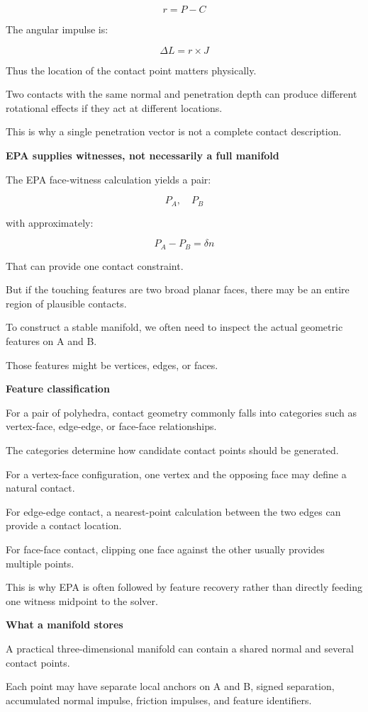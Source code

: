 \[
r=P-C
\]

The angular impulse is:

\[
\boxed{ \Delta L=r\times J }
\]

Thus the location of the contact point matters physically.

Two contacts with the same normal and penetration depth can produce different rotational effects if they act at different locations.

This is why a single penetration vector is not a complete contact description.

\textbf{EPA supplies witnesses, not necessarily a full manifold}

The EPA face-witness calculation yields a pair:

\[
P_A,\quad P_B
\]

with approximately:

\[
P_A-P_B=\delta n
\]

That can provide one contact constraint.

But if the touching features are two broad planar faces, there may be an entire region of plausible contacts.

To construct a stable manifold, we often need to inspect the actual geometric features on A and B.

Those features might be vertices, edges, or faces.

\textbf{Feature classification}

For a pair of polyhedra, contact geometry commonly falls into categories such as vertex-face, edge-edge, or face-face relationships.

The categories determine how candidate contact points should be generated.

For a vertex-face configuration, one vertex and the opposing face may define a natural contact.

For edge-edge contact, a nearest-point calculation between the two edges can provide a contact location.

For face-face contact, clipping one face against the other usually provides multiple points.

This is why EPA is often followed by feature recovery rather than directly feeding one witness midpoint to the solver.

\textbf{What a manifold stores}

A practical three-dimensional manifold can contain a shared normal and several contact points.

Each point may have separate local anchors on A and B, signed separation, accumulated normal impulse, friction impulses, and feature identifiers.


